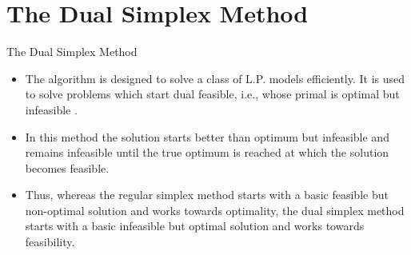 
\section{The Dual Simplex Method}
\label{sec:simplexdual-algorithm}


\begin{frame}{The Dual Simplex Method}
  \begin{itemize} \justifying \parskip3mm
  \item The algorithm is designed to solve a class of L.P. models efficiently. It is used to solve problems which start dual feasible, i.e., whose primal  is optimal but infeasible .
  \item   In this method \alert{the solution starts better than optimum but infeasible} and remains infeasible until the true optimum is reached at which the solution becomes feasible.
  \item Thus, whereas \alert{the regular simplex method starts with a basic feasible but non-optimal solution} and works towards optimality, the dual simplex method starts with a basic infeasible but optimal solution and works towards feasibility.
  \end{itemize}
\end{frame}

